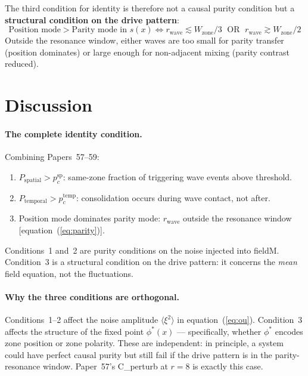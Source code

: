 \documentclass[11pt,a4paper]{article}
\newcommand{\Psp}{P_{\mathrm{spatial}}}
\newcommand{\Ptemp}{P_{\mathrm{temporal}}}
\begin{document}
The third condition for identity is therefore not a causal purity condition but
a \textbf{structural condition on the drive pattern}:
\begin{equation}
  \boxed{
  \text{Position mode} > \text{Parity mode in } s(x)
  \iff r_\mathrm{wave} \lesssim W_\mathrm{zone}/3
  \;\text{ OR }\; r_\mathrm{wave} \gtrsim W_\mathrm{zone}/2
  }
  \label{eq:parity}
\end{equation}
Outside the resonance window, either waves are too small for parity transfer
(position dominates) or large enough for non-adjacent mixing (parity contrast
reduced).

\section{Discussion}

\paragraph{The complete identity condition.}
Combining Papers~57--59:
\begin{enumerate}
  \item $\Psp > p_c^\mathrm{sp}$: same-zone fraction of triggering wave events
    above threshold.
  \item $\Ptemp > p_c^\mathrm{temp}$: consolidation occurs during wave contact,
    not after.
  \item Position mode dominates parity mode: $r_\mathrm{wave}$ outside the
    resonance window [equation~(\ref{eq:parity})].
\end{enumerate}
Conditions~1 and~2 are purity conditions on the noise injected into fieldM.
Condition~3 is a structural condition on the drive pattern: it concerns the
\emph{mean} field equation, not the fluctuations.

\paragraph{Why the three conditions are orthogonal.}
Conditions~1--2 affect the noise amplitude $\langle\xi^2\rangle$ in
equation~(\ref{eq:ou}).
Condition~3 affects the structure of the fixed point $\phi^*(x)$ --- specifically,
whether $\phi^*$ encodes zone position or zone polarity.
These are independent: in principle, a system could have perfect causal purity
but still fail if the drive pattern is in the parity-resonance window.
Paper~57's C\_perturb at $r=8$ is exactly this case.
\end{document}
